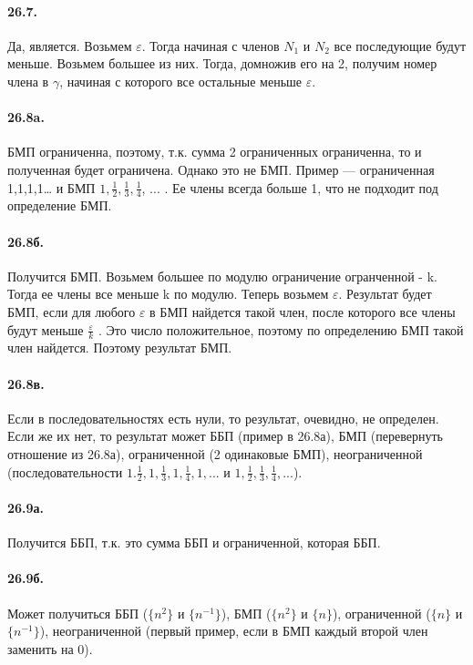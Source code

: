 \documentclass{book}
\begin{document}
\paragraph{26.7.}
Да, является. Возьмем $\varepsilon$. Тогда начиная с членов $N_1$ и $N_2$ все последующие будут меньше. Возьмем большее из них. Тогда, домножив его на 2, получим номер члена в $\gamma$, начиная с которого все остальные меньше $\varepsilon$.

\paragraph{26.8a.}
БМП ограниченна, поэтому, т.к. сумма 2 ограниченных ограниченна, то и полученная будет ограничена. Однако это не БМП. Пример — ограниченная 1,1,1,1… и БМП $1, \frac{1}{2}, \frac{1}{3}, \frac{1}{4}$, ... . Ее члены всегда больше 1, что не подходит под определение БМП.

\paragraph{26.8б.}
Получится БМП. Возьмем большее по модулю ограничение огранченной - k. Тогда ее члены все меньше k по модулю. Теперь возьмем $\varepsilon$. Результат будет БМП, если для любого $\varepsilon$ в БМП найдется такой член, после которого все члены будут меньше $\frac{\varepsilon}{k}$ . Это число положительное, поэтому по определению БМП такой член найдется. Поэтому результат БМП.

\paragraph{26.8в.}
Если в последовательностях есть нули, то результат, очевидно, не определен. Если же их нет, то результат может ББП (пример в 26.8а), БМП (перевернуть отношение из 26.8а), ограниченной (2 одинаковые БМП), неограниченной (последовательности $1. \frac{1}{2}, 1, \frac{1}{3}, 1, \frac{1}{4}, 1, ...$ и $1, \frac{1}{2}, \frac{1}{3}, \frac{1}{4}, ...$).

\paragraph{26.9а.}
Получится ББП, т.к. это сумма ББП и ограниченной, которая ББП.

\paragraph{26.9б.}
Может получиться ББП ($\{n^2\}$ и $\{{n^{-1}}\}$), БМП ($\{n^2\}$ и $\{n\}$), ограниченной ($\{n\}$ и $\{n^{-1}\}$), неограниченной (первый пример, если в БМП каждый второй член заменить на 0).
\end{document}
